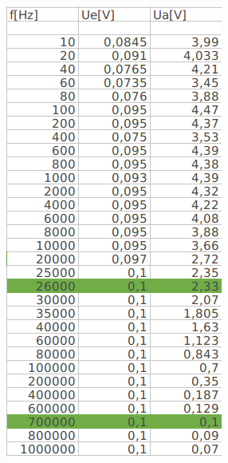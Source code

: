 \documentclass[12pt,a4paper,titlepage]{article}
\begin{document}
\begin{figure}[H]
  \centering
  \begin{minipage}[b]{0.4\textwidth}
    \includegraphics[width=\textwidth]{daten_471.png}

\end{minipage}
\end{figure}
\end{document}

